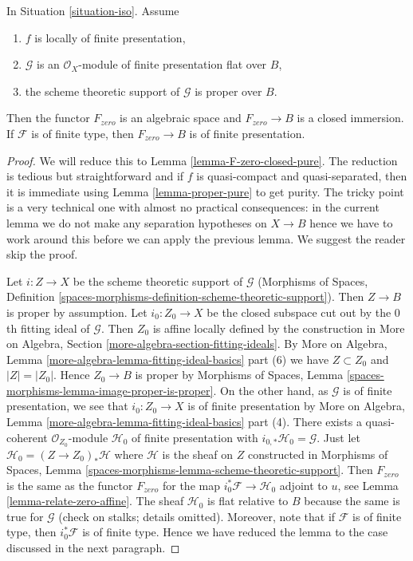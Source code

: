 \begin{lemma}
\label{lemma-F-zero-closed-proper}
In Situation \ref{situation-iso}. Assume
\begin{enumerate}
\item $f$ is locally of finite presentation,
\item $\mathcal{G}$ is an $\mathcal{O}_X$-module of finite presentation
flat over $B$,
\item the scheme theoretic support of $\mathcal{G}$ is proper over $B$.
\end{enumerate}
Then the functor $F_{zero}$ is an algebraic space and $F_{zero} \to B$
is a closed immersion. If $\mathcal{F}$ is of finite type, then
$F_{zero} \to B$ is of finite presentation.
\end{lemma}

\begin{proof}
We will reduce this to Lemma \ref{lemma-F-zero-closed-pure}.
The reduction is tedious but straightforward and if
$f$ is quasi-compact and quasi-separated, then it is immediate using
Lemma \ref{lemma-proper-pure} to get purity.
The tricky point is a very technical one with almost
no practical consequences: in the current lemma we do not make
any separation hypotheses on $X \to B$ hence we have to work around
this before we can apply the previous lemma.
We suggest the reader skip the proof.

\medskip\noindent
Let $i : Z \to X$ be the scheme theoretic support of $\mathcal{G}$
(Morphisms of Spaces, Definition
\ref{spaces-morphisms-definition-scheme-theoretic-support}).
Then $Z \to B$ is proper by assumption.
Let $i_0 : Z_0 \to X$ be the closed subspace cut out by the
$0$th fitting ideal of $\mathcal{G}$. Then $Z_0$ is
affine locally defined by the construction in
More on Algebra, Section \ref{more-algebra-section-fitting-ideals}.
By More on Algebra, Lemma
\ref{more-algebra-lemma-fitting-ideal-basics} part (6)
we have $Z \subset Z_0$ and $|Z| = |Z_0|$. Hence $Z_0 \to B$
is proper by 
Morphisms of Spaces, Lemma \ref{spaces-morphisms-lemma-image-proper-is-proper}.
On the other hand, as $\mathcal{G}$ is of finite presentation,
we see that $i_0 : Z_0 \to X$ is of finite presentation by
More on Algebra, Lemma
\ref{more-algebra-lemma-fitting-ideal-basics} part (4).
There exists a quasi-coherent $\mathcal{O}_{Z_0}$-module
$\mathcal{H}_0$ of finite presentation with
$i_{0, *}\mathcal{H}_0 = \mathcal{G}$.
Just let $\mathcal{H}_0 = (Z \to Z_0)_*\mathcal{H}$ where
$\mathcal{H}$ is the sheaf on $Z$ constructed in
Morphisms of Spaces, Lemma
\ref{spaces-morphisms-lemma-scheme-theoretic-support}.
Then $F_{zero}$ is the same as the functor $F_{zero}$
for the map $i_0^*\mathcal{F} \to \mathcal{H}_0$ adjoint to $u$, see
Lemma \ref{lemma-relate-zero-affine}.
The sheaf $\mathcal{H}_0$ is flat relative to $B$ because
the same is true for $\mathcal{G}$ (check on stalks; details omitted).
Moreover, note that if $\mathcal{F}$ is of finite type,
then $i_0^*\mathcal{F}$ is of finite type.
Hence we have reduced the lemma to the case
discussed in the next paragraph.


\end{proof}
